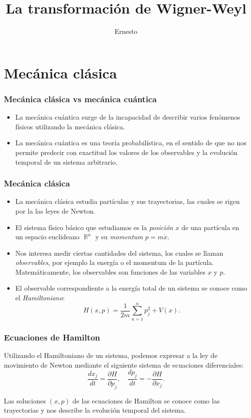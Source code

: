 \documentclass{beamer}
\title{La transformación de Wigner-Weyl}
\author{Ernesto}
\institute{U de G}
\DeclareMathOperator{\R}{\mathbb{R}}
\begin{document}
\frame{\titlepage}

\frame{\tableofcontents}

\section{Mecánica clásica}

\begin{frame}
  \frametitle{Mecánica clásica vs mecánica cuántica}

  \begin{itemize}
    \item La mecánica cuántica surge de la incapacidad de
      describir varios fenómenos físicos utilizando la
      mecánica clásica.
    \item La mecánica cuántica es una teoría probabilística,
      en el sentido de que no nos permite predecir con
      exactitud los valores de los observables y la
      evolución temporal de un sistema arbitrario.
  \end{itemize}
\end{frame}

\begin{frame}
  \frametitle{Mecánica clásica}

  \begin{itemize}
    \item La mecánica clásica estudia partículas y sus
      trayectorias, las cuales se rigen por la las leyes de
      Newton.
    \item El sistema físico básico que estudiamos es la
      \textit{posición} $x$ de una partícula en un espacio
      euclideano $\R^{n}$ y su \textit{momentum} $p = m
      \dot{x}$. 
    \item Nos interesa medir ciertas cantidades del sistema,
      los cuales se llaman \textit{observables}, por ejemplo
      la energía o el momentum de la partícula.
      Matemáticamente, los observables son funciones de las
      variables $x$ y $p$.
    \item El observable correspondiente a la energía total
      de un sistema se conoce como el \textit{Hamiltoniano}:
      \[
        H(x,p)
        = \frac{1}{2m} \sum_{n=1}^{n} p_j^2 + V(x).
      \] 
  \end{itemize}
\end{frame}

\begin{frame}
  \frametitle{Ecuaciones de Hamilton}

  Utilizando el Hamiltoniano de un sistema, podemos expresar
  a la ley de movimiento de Newton mediante el siguiente
  sistema de ecuaciones diferenciales:
  \begin{equation}
    \frac{dx_j}{dt} = \frac{\partial H}{\partial p_j},
    \quad
    \frac{dp_j}{dt} = -\frac{\partial H}{\partial x_j}.
  \end{equation}

  Las soluciones $(x,p)$ de las ecuaciones de Hamilton se
  conoce como las trayectorias y nos describe la evolución
  temporal del sistema.
\end{frame}
\end{document}
